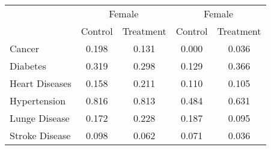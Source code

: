 \begin{tabular}{lcccc} \toprule
 & \multicolumn{2}{c}{Female} & \multicolumn{2}{c}{Female} \\
 & Control  & Treatment  & Control  & Treatment  \\  \midrule 
Cancer              &     0.198 &     0.131 &     0.000 &     0.036 \\  
Diabetes           &     0.319 &     0.298 &     0.129 &     0.366 \\  
Heart Diseases  &     0.158 &     0.211 &     0.110 &     0.105 \\  
Hypertension    &     0.816 &     0.813 &     0.484 &     0.631 \\  
Lunge Disease  &     0.172 &     0.228 &     0.187 &     0.095 \\  
Stroke Disease &     0.098 &     0.062 &     0.071 &     0.036 \\  \toprule \end{tabular}
